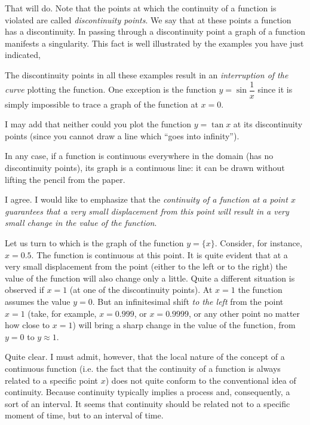 {\athr That will do. Note that the points at which the continuity of a function is violated are called \emph{discontinuity points}. We say that at these points a function has a discontinuity. In passing through a discontinuity point a graph of a function manifests a singularity. This fact is well illustrated by the examples you have just indicated,

\rdr The discontinuity points in all these examples result in an \emph{interruption of the curve} plotting the function.
One exception is the function  $y = \sin \dfrac{1}{x}$  since it is simply impossible to trace a graph of the function at $x = 0$. 

\athr I may add that neither could you plot the function $y = \tan x$ at its discontinuity points (since you cannot draw a line which ``goes into infinity''). 

\rdr In any case, if a function is continuous everywhere in the domain (has no discontinuity points), its graph is a continuous line: it can be drawn without lifting
the pencil from the paper. 

\athr I agree. I would like to emphasize that the \emph{continuity of a function at a point $x$ guarantees that a very small displacement from this point will result in a very small change in the value of the function}.

Let us turn to  which is the graph of the function $y = \{x\}$. Consider, for instance, $x = 0.5$. The function is continuous at this point. It is quite evident that at a very small displacement from the point (either to the left or to the right) the value of the function will also change only a little. Quite a different situation is observed if $x = 1$ (at one of the discontinuity points). At $x = 1$ the function assumes the value $y = 0$. But an infinitesimal shift \emph{to the left} from the point $x = 1$ (take, for example, $x = 0.999$, or $x = 0.9999$, or any other point no matter how close to $x = 1$) will bring a sharp change in the value of the function, from $y= 0$ to $y \approx 1 $.

\rdr Quite clear. I must admit, however, that the local nature of the concept of a continuous function (i.e. the fact that the continuity of a function is always related to a specific point $x$) does not quite conform to the conventional idea of continuity. Because continuity typically implies a process and, consequently, a sort of an interval. It seems that continuity should be related not to a specific moment of time, but to an interval of time.

}
